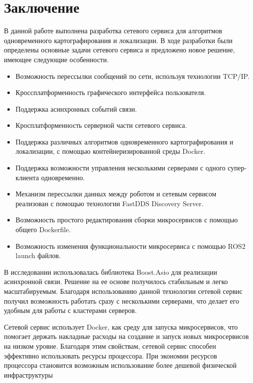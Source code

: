 \documentclass[a4paper, 14pt]{extreport}
\begin{document}
\chapter{Заключение}
\par В данной работе выполнена разработка сетевого сервиса для алгоритмов
одновременного картографирования и локализации. В ходе разработки были 
определены основные задачи сетевого сервиса и предложено новое решение,
имеющее следующие особенности.
\begin{itemize}
        \item Возможность перессылки сообщений по сети, используя технологии TCP/IP.
        \item Кроссплатформенность графического интерфейса пользователя.
        \item Поддержка асинхронных событий связи.
        \item Кросплатформенность серверной части сетевого сервиса.
        \item Поддержка различных алгоритмов одновременного картографирования
         и локализации, с помощью контейнеризированной среды Docker.
        \item Поддержка возможности управления несколькими серверами с
         одного супер-клиента одновременно.
        \item Механизм перессылки данных между роботом и сетевым сервисом
         реализован с помощью технологии FastDDS Discovery Server.
        \item Возможность простого редактирования сборки микросервисов с 
         помощью общего Dockerfile.
        \item Возможность изменения функциональности микросервиса с помощью 
         ROS2 launch файлов.
\end{itemize}
\par В исследовании использовалась библиотека Boost.Asio для реализации 
асинхронной связи. Решение на ее основе получилось стабильным и легко масштабируемым.
Благодаря использованию данной технологии сетевой сервис получил возможность 
работать сразу с несколькими серверами, что делает его удобным для 
работы с кластерами серверов.
\par Сетевой сервис использует Docker, как среду для запуска микросервисов,
что помогает держать накладные расходы на создание и запуск новых микросервисов
на низком уровне. Благодаря этим свойствам, сетевой сервис способен 
эффективно использовать ресурсы процессора. При экономии ресурсов процессора
становится возможным использование более дешевой физической инфраструктуры 
\end{document}
